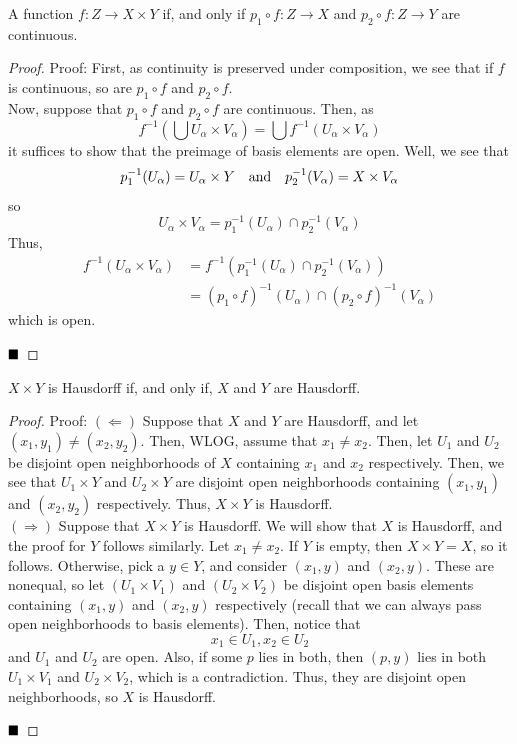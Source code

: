 \begin{lemma}
    A function $f : Z \to X \times Y$ if, and only if $p_1 \circ f : Z \to X$ and $p_2 \circ f : Z \to Y$ are continuous.
\end{lemma}
\begin{proof}{Proof:}
    First, as continuity is preserved under composition, we see that if $f$ is continuous, so are $p_1 \circ f$ and $p_2 \circ f$.\\

    Now, suppose that $p_1 \circ f$ and $p_2 \circ f$ are continuous. Then, as
    \[ f^{-1}\left(\bigcup U_{\alpha} \times V_{\alpha}\right) = \bigcup f^{-1}(U_{\alpha} \times V_{\alpha}) \]
    it suffices to show that the preimage of basis elements are open. Well, we see that
    \[ p_1^{-1}(U_{\alpha}) = U_{\alpha} \times Y \quad \text{and} \quad p_{2}^{-1}(V_{\alpha}) = X \times V_{\alpha} \]
    so
    \[ U_{\alpha} \times V_{\alpha} = p_1^{-1}(U_{\alpha}) \cap p_2^{-1}(V_{\alpha}) \]
    Thus, 
    \begin{align*}
        f^{-1}(U_{\alpha} \times V_{\alpha}) &= f^{-1}(p_1^{-1}(U_{\alpha}) \cap p_{2}^{-1}(V_{\alpha}))\\
        &= (p_1 \circ f)^{-1}(U_{\alpha}) \cap (p_2 \circ f)^{-1}(V_{\alpha})
    \end{align*}
    which is open. 

    $\qed$
\end{proof}

\begin{lemma}
    $X \times Y$ is Hausdorff if, and only if, $X$ and $Y$ are Hausdorff. 
\end{lemma}
\begin{proof}{Proof:}
    $(\Leftarrow)$ Suppose that $X$ and $Y$ are Hausdorff, and let $(x_1, y_1) \ne (x_2, y_2)$. Then, WLOG, assume that $x_1 \ne x_2$. Then, let $U_1$ and $U_2$ be disjoint open neighborhoods of $X$ containing $x_1$ and $x_2$ respectively. Then, we see that $U_1 \times Y$ and $U_2 \times Y$ are disjoint open neighborhoods containing $(x_1, y_1)$ and $(x_2, y_2)$ respectively. Thus, $X \times Y$ is Hausdorff.\\

    $(\Rightarrow)$ Suppose that $X \times Y$ is Hausdorff. We will show that $X$ is Hausdorff, and the proof for $Y$ follows similarly. Let $x_1 \ne x_2$. If $Y$ is empty, then $X \times Y = X$, so it follows. Otherwise, pick a $y \in Y$, and consider $(x_1, y)$ and $(x_2, y)$. These are nonequal, so let $(U_1 \times V_1)$ and $(U_2 \times V_2)$ be disjoint open basis elements containing $(x_1, y)$ and $(x_2, y)$ respectively (recall that we can always pass open neighborhoods to basis elements). Then, notice that
    \[ x_1 \in U_1, x_2 \in U_2 \]
    and $U_1$ and $U_2$ are open. Also, if some $p$ lies in both, then $(p, y)$ lies in both $U_1 \times V_1$ and $U_2 \times V_2$, which is a contradiction. Thus, they are disjoint open neighborhoods, so $X$ is Hausdorff. 

    $\qed$
\end{proof}

